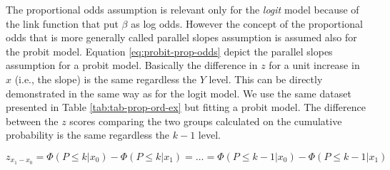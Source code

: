\documentclass[
  man,floatsintext]{apa6}
\newenvironment{Shaded}{\begin{snugshade}}{\end{snugshade}}
\newcommand{\AttributeTok}[1]{\textcolor[rgb]{0.13,0.29,0.53}{#1}}
\newcommand{\CommentTok}[1]{\textcolor[rgb]{0.56,0.35,0.01}{\textit{#1}}}
\newcommand{\DecValTok}[1]{\textcolor[rgb]{0.00,0.00,0.81}{#1}}
\newcommand{\DocumentationTok}[1]{\textcolor[rgb]{0.56,0.35,0.01}{\textbf{\textit{#1}}}}
\newcommand{\FunctionTok}[1]{\textcolor[rgb]{0.13,0.29,0.53}{\textbf{#1}}}
\newcommand{\NormalTok}[1]{#1}
\newcommand{\OtherTok}[1]{\textcolor[rgb]{0.56,0.35,0.01}{#1}}
\newcommand{\SpecialCharTok}[1]{\textcolor[rgb]{0.81,0.36,0.00}{\textbf{#1}}}
\newcommand{\StringTok}[1]{\textcolor[rgb]{0.31,0.60,0.02}{#1}}
\begin{document}
The proportional odds assumption is relevant only for the \emph{logit} model because of the link function that put \(\beta\) as log odds. However the concept of the proportional odds that is more generally called parallel slopes assumption is assumed also for the probit model. Equation \eqref{eq:probit-prop-odds} depict the parallel slopes assumption for a probit model. Basically the difference in \(z\) for a unit increase in \(x\) (i.e., the slope) is the same regardless the \(Y\) level. This can be directly demonstrated in the same way as for the logit model. We use the same dataset presented in Table \ref{tab:tab-prop-ord-ex} but fitting a probit model. The difference between the \(z\) scores comparing the two groups calculated on the cumulative probability is the same regardless the \(k - 1\) level.

\[
z_{x_1 - x_0} = \Phi(P \leq k|x_0) - \Phi(P \leq k|x_1) = \dots = \Phi(P \leq k - 1|x_0) - \Phi(P \leq k - 1|x_1)
\]

\scriptsize

\begin{Shaded}
\end{Shaded}
\end{document}
